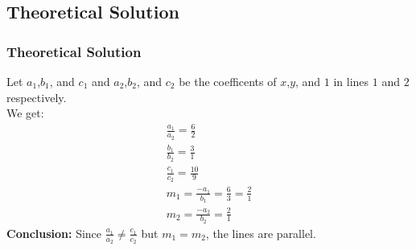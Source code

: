 \documentclass{beamer}
\theoremstyle{remark}
\numberwithin{equation}{section}
\begin{document}
\subsection{Theoretical Solution}
\begin{frame}
\frametitle{Theoretical Solution}

Let $a_1$,$b_1$, and $c_1$ and $a_2$,$b_2$, and $c_2$ be the coefficents of $x$,$y$, and $1$ in lines $1$ and $2$ respectively.\\
We get:
\begin{align}
    \frac{a_1}{a_2}=\frac{6}{2}\\
    \frac{b_1}{b_2}=\frac{3}{1}\\
    \frac{c_1}{c_2}=\frac{10}{9}\\
    m_1=\frac{-a_1}{b_1}=\frac{6}{3} = \frac{2}{1}\\
    m_2=\frac{-a_2}{b_2}=\frac{2}{1}
\end{align}
\textbf{Conclusion:} Since $\frac{a_1}{a_2} \neq \frac{c_1}{c_2}$ but $m_1 = m_2$, the lines are parallel.
\end{frame}
\end{document}
